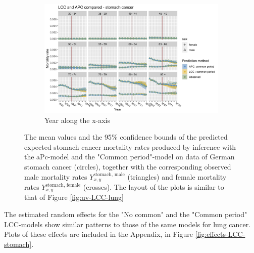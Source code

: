 \begin{figure}
    \begin{subfigure}[b]{.75\linewidth}
        \includegraphics[width=\linewidth]{real-data/real-data-multivariate/Figures/multivariate-comparison-by-period-stomach.png}
        \caption{Year along the x-axis}
        \label{fig:mv-LCC-APC-stomach-bottom}
    \end{subfigure}
    \caption{The mean values and the 95\% confidence bounds of the predicted expected stomach cancer mortality rates produced by inference with the aPc-model and the "Common period"-model on data of German stomach cancer (circles), together with the corresponding observed male mortality rates $Y_{x,y}^{\text{stomach, male}}$ (triangles) and female mortality rates $Y_{x,y}^{\text{stomach, female}}$ (crosses). The layout of the plots is similar to that of Figure \ref{fig:uv-LCC-lung}}
    \label{fig:mv-LCC-APC-stomach}
\end{figure}

\newpar The estimated random effects for the "No common" and the "Common period" LCC-models show similar patterns to those of the same models for lung cancer. Plots of these effects are included in the Appendix, in Figure \ref{fig:effects-LCC-stomach}.

